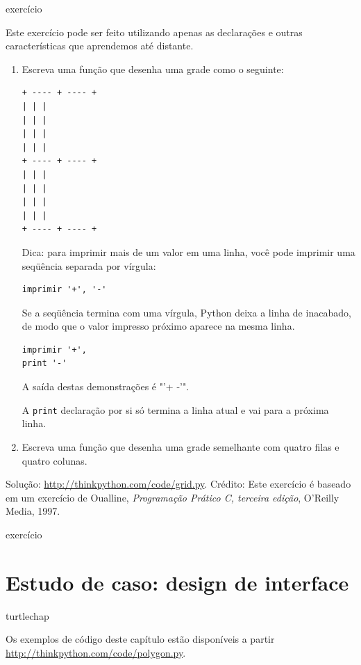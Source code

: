 \documentclass[10pt]{book}
\begin{document}
\begin{} exercício

Este exercício pode ser
feito utilizando apenas as declarações e outras características que aprendemos até
distante.  

\begin{enumerate}

\item Escreva uma função que desenha uma grade como o seguinte:

\begin{verbatim}
+ ---- + ---- +
| | |
| | |
| | |
| | |
+ ---- + ---- +
| | |
| | |
| | |
| | |
+ ---- + ---- +
\end{verbatim}
%
Dica: para imprimir mais de um valor em uma linha, você pode imprimir
uma seqüência separada por vírgula:

\begin{verbatim}
imprimir '+', '-'
\end{verbatim}
%
Se a seqüência termina com uma vírgula, Python deixa a linha de inacabado,
de modo que o valor impresso próximo aparece na mesma linha.

\begin{verbatim}
imprimir '+', 
print '-'
\end{verbatim}
%
A saída destas demonstrações é \verbo "'+ -'".

A {\tt print} declaração por si só termina a linha atual e
vai para a próxima linha.

\item Escreva uma função que desenha uma grade semelhante
com quatro filas e quatro colunas.

\end{enumerate}

Solução: \url{http://thinkpython.com/code/grid.py}.
Crédito: Este exercício é baseado em um exercício de Oualline, {\em
    Programação Prático C, terceira edição}, O'Reilly Media, 1997.

\end{} exercício





\chapter{Estudo de caso: design de interface}
\label{} turtlechap

Os exemplos de código deste capítulo estão disponíveis a partir
\url{http://thinkpython.com/code/polygon.py}.
\end{document}
